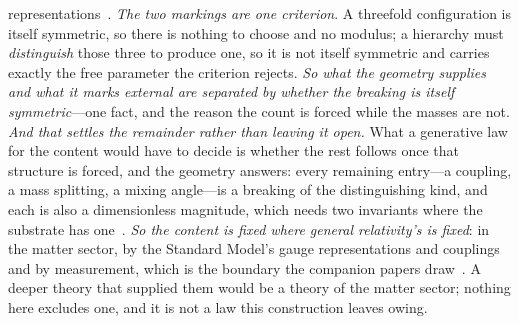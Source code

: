 \documentclass[11pt,a4paper]{article}
\theoremstyle{definition}
\begin{document}
representations~\cite{JanzenMatter}. \emph{The two markings are one criterion}. A threefold configuration is itself symmetric, so there is nothing to choose and no modulus; a hierarchy must \emph{distinguish} those three to produce one, so it is not itself symmetric and carries exactly the free parameter the criterion rejects. \emph{So what the geometry supplies and what it marks external are separated by whether the breaking is itself symmetric}---one fact, and the reason the count is forced while the masses are not. \emph{And that settles the remainder rather than leaving it open.} What a generative law for the content would have to decide is whether the rest follows once that structure is forced, and the geometry answers: every remaining entry---a coupling, a mass splitting, a mixing angle---is a breaking of the distinguishing kind, and each is also a dimensionless magnitude, which needs two invariants where the substrate has one~\cite{JanzenGeometricCore,JanzenCRframework}. \emph{So the content is fixed where general relativity's is fixed}: in the matter sector, by the Standard Model's gauge representations and couplings and by measurement, which is the boundary the companion papers draw~\cite{JanzenBoundary, JanzenMatter}. A deeper theory that supplied them would be a theory of the matter sector; nothing here excludes one, and it is not a law this construction leaves owing.
\end{document}
